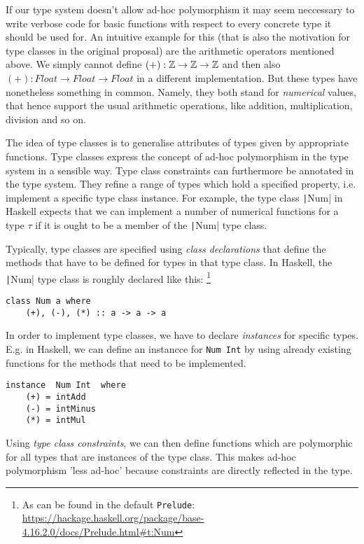 If our type system doesn't allow ad-hoc polymorphism it may seem neccessary to write verbose code for basic functions with respect to every concrete type it should be used for.
An intuitive example for this (that is also the motivation for type classes in the original proposal) are the arithmetic operators mentioned above.
We simply cannot define $(+) : \mathbb{Z} \to \mathbb{Z} \to \mathbb{Z}$ and then also $(+) : \mathit{Float} \to \mathit{Float} \to \mathit{Float}$ in a different implementation.
But these types have nonetheless something in common.
Namely, they both stand for \emph{numerical} values, that hence support the usual arithmetic operations, like addition, multiplication, division and so on.

The idea of type classes is to generalise attributes of types given by appropriate functions.
Type classes express the concept of ad-hoc polymorphism in the type system in a sensible way.
Type class constraints can furthermore be annotated in the type system.
They refine a range of types which hold a specified property, i.e. implement a specific type class instance.
For example, the type class \texttt|Num| in Haskell expects that we can implement a number of numerical functions for a type $\tau$ if it is ought to be a member of the \texttt|Num| type class.

Typically, type classes are specified using \emph{class declarations} that define the methods that have to be defined for types in that type class.
In Haskell, the \texttt|Num| type class is roughly declared like this:
\footnote{As can be found in the default \texttt{Prelude}: \url{https://hackage.haskell.org/package/base-4.16.2.0/docs/Prelude.html\#t:Num}}

\begin{verbatim}
class Num a where
    (+), (-), (*) :: a -> a -> a
\end{verbatim}

In order to implement type classes, we have to declare \emph{instances} for specific types.
E.g. in Haskell, we can define an instancce for \texttt{Num Int} by using already existing functions for the methods that need to be implemented.

\begin{verbatim}
instance  Num Int  where
    (+) = intAdd
    (-) = intMinus
    (*) = intMul
\end{verbatim}

Using \emph{type class constraints}, we can then define functions which are polymorphic for all types that are instances of the type class.
This makes ad-hoc polymorphism 'less ad-hoc' \cite{wadlerblott} because constraints are directly reflected in the type.

